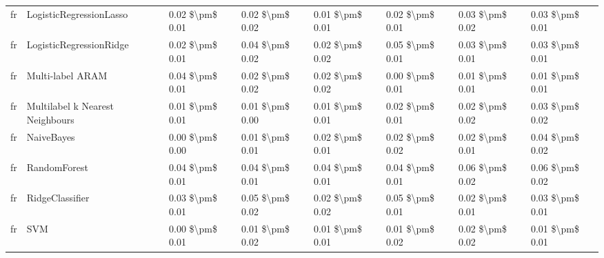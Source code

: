 \begin{tabular}{llllllll}
      fr &         LogisticRegressionLasso & 0.02 \$\textbackslash pm\$ 0.01 &           0.02 \$\textbackslash pm\$ 0.02 &       0.01 \$\textbackslash pm\$ 0.01 &        0.02 \$\textbackslash pm\$ 0.01 &                         0.03 \$\textbackslash pm\$ 0.02 &     0.03 \$\textbackslash pm\$ 0.01 \\
      fr &         LogisticRegressionRidge & 0.02 \$\textbackslash pm\$ 0.01 &           0.04 \$\textbackslash pm\$ 0.02 &       0.02 \$\textbackslash pm\$ 0.02 &        0.05 \$\textbackslash pm\$ 0.01 &                         0.03 \$\textbackslash pm\$ 0.01 &     0.03 \$\textbackslash pm\$ 0.01 \\
      fr &                Multi-label ARAM & 0.04 \$\textbackslash pm\$ 0.01 &           0.02 \$\textbackslash pm\$ 0.02 &       0.02 \$\textbackslash pm\$ 0.02 &        0.00 \$\textbackslash pm\$ 0.01 &                         0.01 \$\textbackslash pm\$ 0.01 &     0.01 \$\textbackslash pm\$ 0.01 \\
      fr & Multilabel k Nearest Neighbours & 0.01 \$\textbackslash pm\$ 0.01 &           0.01 \$\textbackslash pm\$ 0.00 &       0.01 \$\textbackslash pm\$ 0.01 &        0.02 \$\textbackslash pm\$ 0.01 &                         0.02 \$\textbackslash pm\$ 0.02 &     0.03 \$\textbackslash pm\$ 0.02 \\
      fr &                      NaiveBayes & 0.00 \$\textbackslash pm\$ 0.00 &           0.01 \$\textbackslash pm\$ 0.01 &       0.02 \$\textbackslash pm\$ 0.01 &        0.02 \$\textbackslash pm\$ 0.02 &                         0.02 \$\textbackslash pm\$ 0.01 &     0.04 \$\textbackslash pm\$ 0.02 \\
      fr &                    RandomForest & 0.04 \$\textbackslash pm\$ 0.01 &           0.04 \$\textbackslash pm\$ 0.01 &       0.04 \$\textbackslash pm\$ 0.01 &        0.04 \$\textbackslash pm\$ 0.01 &                         0.06 \$\textbackslash pm\$ 0.02 &     0.06 \$\textbackslash pm\$ 0.02 \\
      fr &                 RidgeClassifier & 0.03 \$\textbackslash pm\$ 0.01 &           0.05 \$\textbackslash pm\$ 0.02 &       0.02 \$\textbackslash pm\$ 0.02 &        0.05 \$\textbackslash pm\$ 0.01 &                         0.02 \$\textbackslash pm\$ 0.01 &     0.03 \$\textbackslash pm\$ 0.01 \\
      fr &                             SVM & 0.00 \$\textbackslash pm\$ 0.01 &           0.01 \$\textbackslash pm\$ 0.02 &       0.01 \$\textbackslash pm\$ 0.01 &        0.01 \$\textbackslash pm\$ 0.02 &                         0.02 \$\textbackslash pm\$ 0.02 &     0.01 \$\textbackslash pm\$ 0.01 \\

\end{tabular}

